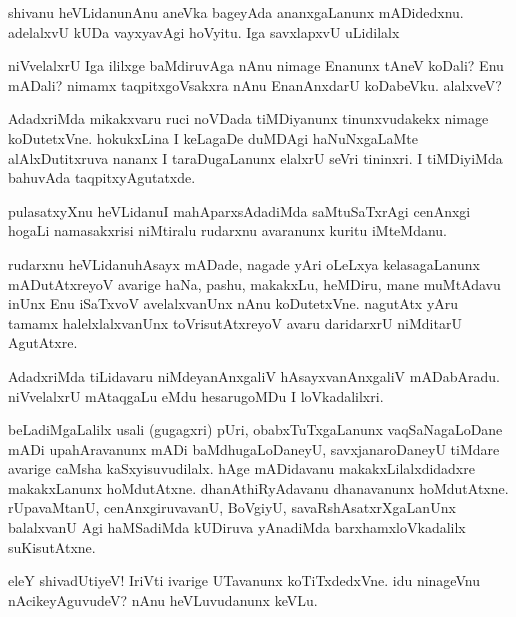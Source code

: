\begin{mng}
shivanu heVLidanu\mdash nAnu aneVka bageyAda ananxgaLanunx mADidedxnu. adelalxvU kUDa vayxyavAgi hoVyitu. Iga savxlapxvU uLidilalx
\end{mng}

\begin{mng}
niVvelalxrU Iga ililxge baMdiruvAga nAnu nimage Enanunx tAneV koDali? Enu mADali? nimamx taqpitxgoVsakxra nAnu EnanAnxdarU koDabeVku. alalxveV?
\end{mng}

\begin{mng}
AdadxriMda mikakxvaru ruci noVDada tiMDiyanunx tinunxvudakekx nimage koDutetxVne. hokukxLina I keLagaDe duMDAgi haNuNxgaLaMte alAlxDutitxruva nananx I taraDugaLanunx elalxrU seVri tininxri. I tiMDiyiMda bahuvAda taqpitxyAgutatxde.
\end{mng}

\begin{mng}
pulasatxyXnu heVLidanu\mdash I mahAparxsAdadiMda saMtuSaTxrAgi cenAnxgi hogaLi namasakxrisi niMtiralu rudarxnu avaranunx kuritu iMteMdanu.
\end{mng}

\begin{mng}
rudarxnu heVLidanu\mdash hAsayx mADade, nagade yAri oLeLxya kelasagaLanunx mADutAtxreyoV avarige haNa, pashu, makakxLu, heMDiru, mane muMtAdavu inUnx Enu iSaTxvoV avelalxvanUnx nAnu koDutetxVne. nagutAtx yAru tamamx halelxlalxvanUnx toVrisutAtxreyoV avaru daridarxrU niMditarU AgutAtxre.
\end{mng}

\begin{mng}
AdadxriMda tiLidavaru niMdeyanAnxgaliV hAsayxvanAnxgaliV mADabAradu. niVvelalxrU mAtaqgaLu eMdu hesarugoMDu I loVkadalilxri.
\end{mng}

\begin{mng}
beLadiMgaLalilx usali (gugagxri) pUri, obabxTuTxgaLanunx vaqSaNagaLoDane mADi upahAravanunx mADi baMdhugaLoDaneyU, savxjanaroDaneyU tiMdare avarige caMsha kaSxyisuvudilalx. hAge mADidavanu makakxLilalxdidadxre makakxLanunx hoMdutAtxne. dhanAthiRyAdavanu dhanavanunx hoMdutAtxne. rUpavaMtanU, cenAnxgiruvavanU, BoVgiyU, savaRshAsatxrXgaLanUnx balalxvanU Agi haMSadiMda kUDiruva yAnadiMda barxhamxloVkadalilx suKisutAtxne.
\end{mng}

\begin{mng}
eleY shivadUtiyeV! IriVti ivarige UTavanunx koTiTxdedxVne. idu ninageVnu nAcikeyAguvudeV? nAnu heVLuvudanunx keVLu.
\end{mng}

